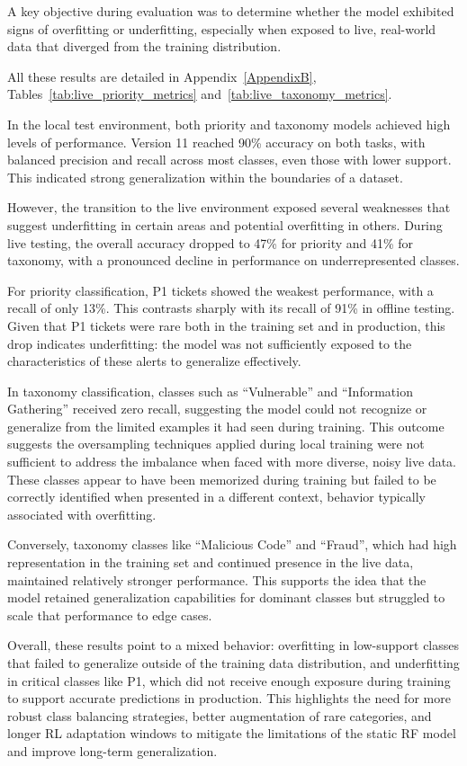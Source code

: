 A key objective during evaluation was to determine whether the model exhibited signs of overfitting or underfitting, especially when exposed to live, real-world data that diverged from the training distribution.

All these results are detailed in Appendix~\ref{AppendixB}, Tables~\ref{tab:live_priority_metrics} and~\ref{tab:live_taxonomy_metrics}.

In the local test environment, both priority and taxonomy models achieved high levels of performance. 
Version 11 reached 90\% accuracy on both tasks, with balanced precision and recall across most classes, even those with lower support. 
This indicated strong generalization within the boundaries of a dataset.

However, the transition to the live environment exposed several weaknesses that suggest underfitting in certain areas and potential overfitting in others. 
During live testing, the overall accuracy dropped to 47\% for priority and 41\% for taxonomy, with a pronounced decline in performance on underrepresented classes.

For priority classification, P1 tickets showed the weakest performance, with a recall of only 13\%. 
This contrasts sharply with its recall of 91\% in offline testing. 
Given that P1 tickets were rare both in the training set and in production, this drop indicates underfitting: the model was not sufficiently exposed to the characteristics of these alerts to generalize effectively.

In taxonomy classification, classes such as “Vulnerable” and “Information Gathering” received zero recall, suggesting the model could not recognize or generalize from the limited examples it had seen during training. 
This outcome suggests the oversampling techniques applied during local training were not sufficient to address the imbalance when faced with more diverse, noisy live data. 
These classes appear to have been memorized during training but failed to be correctly identified when presented in a different context, behavior typically associated with overfitting.

Conversely, taxonomy classes like “Malicious Code” and “Fraud”, which had high representation in the training set and continued presence in the live data, maintained relatively stronger performance. 
This supports the idea that the model retained generalization capabilities for dominant classes but struggled to scale that performance to edge cases.

Overall, these results point to a mixed behavior: overfitting in low-support classes that failed to generalize outside of the training data distribution, and underfitting in critical classes like P1, which did not receive enough exposure during training to support accurate predictions in production. 
This highlights the need for more robust class balancing strategies, better augmentation of rare categories, and longer RL adaptation windows to mitigate the limitations of the static RF model and improve long-term generalization.

